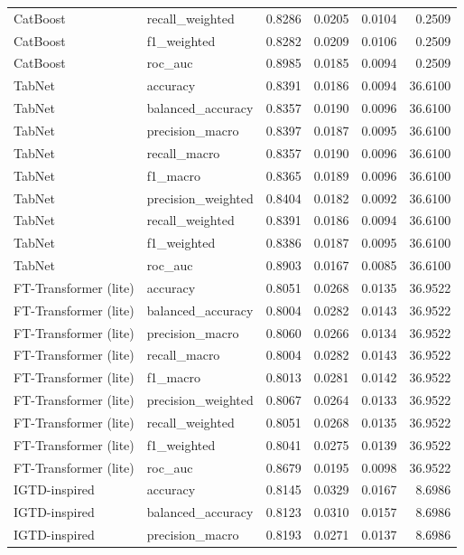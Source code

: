 \begin{tabular}{llrrrr}
CatBoost & recall_weighted & 0.8286 & 0.0205 & 0.0104 & 0.2509 \\
CatBoost & f1_weighted & 0.8282 & 0.0209 & 0.0106 & 0.2509 \\
CatBoost & roc_auc & 0.8985 & 0.0185 & 0.0094 & 0.2509 \\
TabNet & accuracy & 0.8391 & 0.0186 & 0.0094 & 36.6100 \\
TabNet & balanced_accuracy & 0.8357 & 0.0190 & 0.0096 & 36.6100 \\
TabNet & precision_macro & 0.8397 & 0.0187 & 0.0095 & 36.6100 \\
TabNet & recall_macro & 0.8357 & 0.0190 & 0.0096 & 36.6100 \\
TabNet & f1_macro & 0.8365 & 0.0189 & 0.0096 & 36.6100 \\
TabNet & precision_weighted & 0.8404 & 0.0182 & 0.0092 & 36.6100 \\
TabNet & recall_weighted & 0.8391 & 0.0186 & 0.0094 & 36.6100 \\
TabNet & f1_weighted & 0.8386 & 0.0187 & 0.0095 & 36.6100 \\
TabNet & roc_auc & 0.8903 & 0.0167 & 0.0085 & 36.6100 \\
FT-Transformer (lite) & accuracy & 0.8051 & 0.0268 & 0.0135 & 36.9522 \\
FT-Transformer (lite) & balanced_accuracy & 0.8004 & 0.0282 & 0.0143 & 36.9522 \\
FT-Transformer (lite) & precision_macro & 0.8060 & 0.0266 & 0.0134 & 36.9522 \\
FT-Transformer (lite) & recall_macro & 0.8004 & 0.0282 & 0.0143 & 36.9522 \\
FT-Transformer (lite) & f1_macro & 0.8013 & 0.0281 & 0.0142 & 36.9522 \\
FT-Transformer (lite) & precision_weighted & 0.8067 & 0.0264 & 0.0133 & 36.9522 \\
FT-Transformer (lite) & recall_weighted & 0.8051 & 0.0268 & 0.0135 & 36.9522 \\
FT-Transformer (lite) & f1_weighted & 0.8041 & 0.0275 & 0.0139 & 36.9522 \\
FT-Transformer (lite) & roc_auc & 0.8679 & 0.0195 & 0.0098 & 36.9522 \\
IGTD-inspired & accuracy & 0.8145 & 0.0329 & 0.0167 & 8.6986 \\
IGTD-inspired & balanced_accuracy & 0.8123 & 0.0310 & 0.0157 & 8.6986 \\
IGTD-inspired & precision_macro & 0.8193 & 0.0271 & 0.0137 & 8.6986 \\

\end{tabular}
